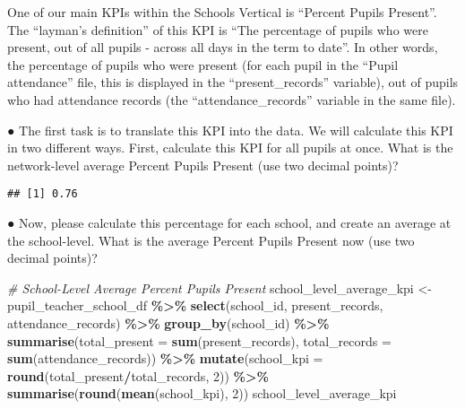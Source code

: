 \documentclass[
]{article}
\newenvironment{Shaded}{\begin{snugshade}}{\end{snugshade}}
\newcommand{\AttributeTok}[1]{\textcolor[rgb]{0.13,0.29,0.53}{#1}}
\newcommand{\CommentTok}[1]{\textcolor[rgb]{0.56,0.35,0.01}{\textit{#1}}}
\newcommand{\DecValTok}[1]{\textcolor[rgb]{0.00,0.00,0.81}{#1}}
\newcommand{\FunctionTok}[1]{\textcolor[rgb]{0.13,0.29,0.53}{\textbf{#1}}}
\newcommand{\NormalTok}[1]{#1}
\newcommand{\OtherTok}[1]{\textcolor[rgb]{0.56,0.35,0.01}{#1}}
\newcommand{\SpecialCharTok}[1]{\textcolor[rgb]{0.81,0.36,0.00}{\textbf{#1}}}
\begin{document}
One of our main KPIs within the Schools Vertical is ``Percent Pupils
Present''. The ``layman's definition'' of this KPI is ``The percentage
of pupils who were present, out of all pupils - across all days in the
term to date''. In other words, the percentage of pupils who were
present (for each pupil in the ``Pupil attendance'' file, this is
displayed in the ``present\_records'' variable), out of pupils who had
attendance records (the ``attendance\_records'' variable in the same
file).

● The first task is to translate this KPI into the data. We will
calculate this KPI in two different ways. First, calculate this KPI for
all pupils at once. What is the network-level average Percent Pupils
Present (use two decimal points)?

\begin{Shaded}
\end{Shaded}

\begin{verbatim}
## [1] 0.76
\end{verbatim}

● Now, please calculate this percentage for each school, and create an
average at the school-level. What is the average Percent Pupils Present
now (use two decimal points)?

\begin{Shaded}
\begin{Highlighting}[]
\CommentTok{\# School{-}Level Average Percent Pupils Present}
\NormalTok{school\_level\_average\_kpi }\OtherTok{\textless{}{-}}\NormalTok{ pupil\_teacher\_school\_df }\SpecialCharTok{\%\textgreater{}\%}
  \FunctionTok{select}\NormalTok{(school\_id, present\_records, attendance\_records) }\SpecialCharTok{\%\textgreater{}\%}
  \FunctionTok{group\_by}\NormalTok{(school\_id) }\SpecialCharTok{\%\textgreater{}\%}
  \FunctionTok{summarise}\NormalTok{(}\AttributeTok{total\_present =} \FunctionTok{sum}\NormalTok{(present\_records), }\AttributeTok{total\_records =} \FunctionTok{sum}\NormalTok{(attendance\_records)) }\SpecialCharTok{\%\textgreater{}\%}
  \FunctionTok{mutate}\NormalTok{(}\AttributeTok{school\_kpi =} \FunctionTok{round}\NormalTok{(total\_present}\SpecialCharTok{/}\NormalTok{total\_records, }\DecValTok{2}\NormalTok{)) }\SpecialCharTok{\%\textgreater{}\%}
  \FunctionTok{summarise}\NormalTok{(}\FunctionTok{round}\NormalTok{(}\FunctionTok{mean}\NormalTok{(school\_kpi), }\DecValTok{2}\NormalTok{))}
\NormalTok{school\_level\_average\_kpi}
\end{Highlighting}
\end{Shaded}
\end{document}
